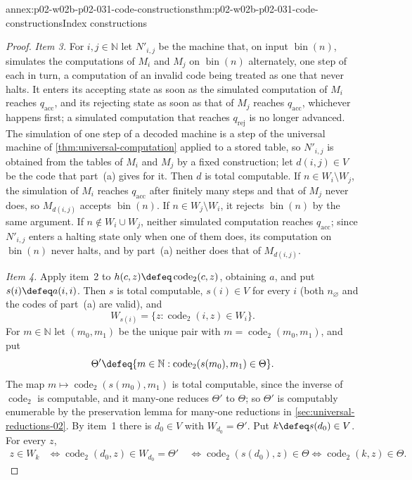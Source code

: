 \begin{annexitem}{annex:p02-w02b-p02-031-code-constructions}{thm:p02-w02b-p02-031-code-constructions}{Index constructions}
\begin{proof}
\emph{Item 3.}  For \(i,j\in\mathbb N\) let \(N'_{i,j}\) be the machine
that, on input \(\operatorname{bin}(n)\), simulates the computations of
\(M_i\) and \(M_j\) on \(\operatorname{bin}(n)\) alternately, one step of each
in turn, a computation of an invalid code being treated as one that never
halts.  It enters its accepting state as soon as the simulated computation of
\(M_i\) reaches \(q_{\mathrm{acc}}\), and its rejecting state as soon as that
of \(M_j\) reaches \(q_{\mathrm{acc}}\), whichever happens first; a simulated
computation that reaches \(q_{\mathrm{rej}}\) is no longer advanced.  The
simulation of one step of a decoded machine is a step of the universal machine
of \cref{thm:universal-computation} applied to a stored table, so
\(N'_{i,j}\) is obtained from the tables of \(M_i\) and \(M_j\) by a fixed
construction; let \(d(i,j)\in V\) be the code that part~(a) gives for it.
Then \(d\) is total computable.  If \(n\in W_i\setminus W_j\), the simulation
of \(M_i\) reaches \(q_{\mathrm{acc}}\) after finitely many steps and that of
\(M_j\) never does, so \(M_{d(i,j)}\) accepts \(\operatorname{bin}(n)\).  If
\(n\in W_j\setminus W_i\), it rejects \(\operatorname{bin}(n)\) by the same
argument.  If \(n\notin W_i\cup W_j\), neither simulated computation reaches
\(q_{\mathrm{acc}}\); since \(N'_{i,j}\) enters a halting state only when one
of them does, its computation on \(\operatorname{bin}(n)\) never halts, and by
part~(a) neither does that of \(M_{d(i,j)}\).

\emph{Item 4.}  Apply item~2 to \(h(c,z)\defeq\operatorname{code}_2(c,z)\),
obtaining \(a\), and put \(s(i)\defeq a(i,i)\).  Then \(s\) is total
computable, \(s(i)\in V\) for every \(i\) (both \(n_\varnothing\) and the
codes of part~(a) are valid), and
\[
 W_{s(i)}=\{z:\operatorname{code}_2(i,z)\in W_i\}.
\]
For \(m\in\mathbb N\) let \((m_0,m_1)\) be the unique pair with
\(m=\operatorname{code}_2(m_0,m_1)\), and put
\[
 \Theta'\defeq\{m\in\mathbb N:\operatorname{code}_2(s(m_0),m_1)\in\Theta\}.
\]
The map \(m\mapsto\operatorname{code}_2(s(m_0),m_1)\) is total computable,
since the inverse of \(\operatorname{code}_2\) is computable, and it many-one
reduces \(\Theta'\) to \(\Theta\); so \(\Theta'\) is computably enumerable by
the preservation lemma for many-one reductions in \cref{sec:universal-reductions-02}.  By item~1 there is \(d_0\in V\) with
\(W_{d_0}=\Theta'\).  Put \(k\defeq s(d_0)\in V\).  For every \(z\),
\[
\begin{aligned}
 z\in W_k
 &\iff \operatorname{code}_2(d_0,z)\in W_{d_0}=\Theta'\
 &\iff \operatorname{code}_2(s(d_0),z)\in\Theta
 \iff \operatorname{code}_2(k,z)\in\Theta .
\end{aligned}
\]
\end{proof}
\end{annexitem}

